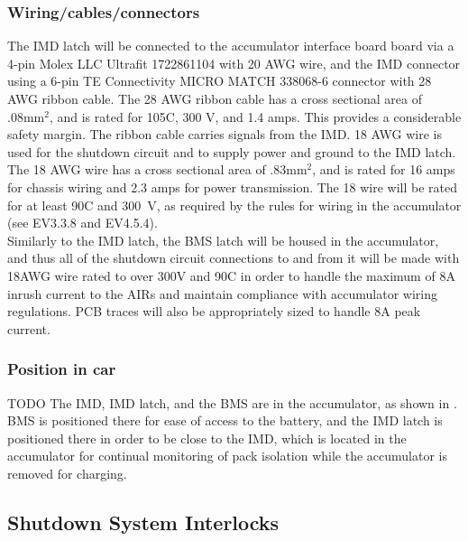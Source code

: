 \documentclass{article}
\begin{document}
\subsubsection{Wiring/cables/connectors}
The IMD latch will be connected to the accumulator interface board board via a 4-pin Molex LLC Ultrafit 1722861104 with 20 AWG wire, and the IMD connector using a  6-pin TE Connectivity MICRO MATCH 338068-6 connector with 28 AWG ribbon cable. The 28 AWG ribbon cable has a cross sectional area of .08mm$^2$, and is rated for 105\textdegree C, 300 V, and 1.4 amps. This provides a considerable safety margin. The ribbon cable carries signals from the IMD. 18 AWG wire is used for the shutdown circuit and to supply power and ground to the IMD latch. The 18 AWG wire has a cross sectional area of .83mm$^2$, and is rated for 16 amps for chassis wiring and 2.3 amps for power transmission. The 18 wire will be rated for at least 90\textdegree C and 300~V, as required by the rules for wiring in the accumulator (see EV3.3.8 and EV4.5.4).\\

Similarly to the IMD latch, the BMS latch will be housed in the accumulator, and thus all of the shutdown circuit connections to and from it will be made with 18AWG wire rated to over 300V and 90\textdegree C in order to handle the maximum of 8A inrush current to the AIRs and maintain compliance with accumulator wiring regulations. PCB traces will also be appropriately sized to handle 8A peak current. 


\subsubsection{Position in car}
TODO
The IMD, IMD latch, and the BMS are in the accumulator, as shown in . BMS is positioned there for ease of access to the battery, and the IMD latch is positioned there in order to be close to the IMD, which is located in the accumulator for continual monitoring of pack isolation while the accumulator is removed for charging. 

\subsection{Shutdown System Interlocks}\label{shutdown_system_interlocks}
\end{document}
